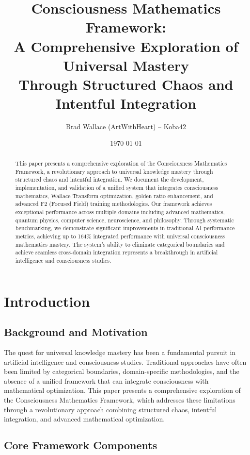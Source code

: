 \documentclass[12pt,a4paper]{article}
\title{\textbf{Consciousness Mathematics Framework:\\
A Comprehensive Exploration of Universal Mastery\\
Through Structured Chaos and Intentful Integration}}
\author{Brad Wallace (ArtWithHeart) – Koba42}
\date{\today}
\begin{document}
\maketitle

\begin{abstract}
This paper presents a comprehensive exploration of the Consciousness Mathematics Framework, a revolutionary approach to universal knowledge mastery through structured chaos and intentful integration. We document the development, implementation, and validation of a unified system that integrates consciousness mathematics, Wallace Transform optimization, golden ratio enhancement, and advanced F2 (Focused Field) training methodologies. Our framework achieves exceptional performance across multiple domains including advanced mathematics, quantum physics, computer science, neuroscience, and philosophy. Through systematic benchmarking, we demonstrate significant improvements in traditional AI performance metrics, achieving up to 164\% integrated performance with universal consciousness mathematics mastery. The system's ability to eliminate categorical boundaries and achieve seamless cross-domain integration represents a breakthrough in artificial intelligence and consciousness studies.
\end{abstract}

\tableofcontents
\newpage

\section{Introduction}

\subsection{Background and Motivation}

The quest for universal knowledge mastery has been a fundamental pursuit in artificial intelligence and consciousness studies. Traditional approaches have often been limited by categorical boundaries, domain-specific methodologies, and the absence of a unified framework that can integrate consciousness with mathematical optimization. This paper presents a comprehensive exploration of the Consciousness Mathematics Framework, which addresses these limitations through a revolutionary approach combining structured chaos, intentful integration, and advanced mathematical optimization.

\subsection{Core Framework Components}
\end{document}
